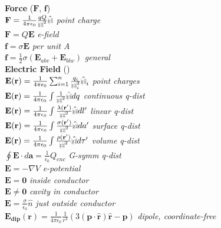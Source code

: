 \documentclass{article}
\def\rcurs{{\mbox{$\resizebox{.09in}{.08in}{\texttt{[image: ScriptR]}}$}}}
\def\brcurs{{\mbox{$\resizebox{.09in}{.08in}{\texttt{[image: BoldR]}}$}}}
\begin{document}
\begin{multicols}{3}
\textbf{Force} ($\mathbf{F}$, $\mathbf{f}$) \\
$\mathbf{F} = \frac{1}{4\pi\epsilon_{0}}\frac{qQ}{\rcurs^{2}}\hat{\brcurs}$  \textit{point charge} \\
$\mathbf{F} = Q\mathbf{E}$ \textit{e-field} \\
$\mathbf{f} = \sigma\mathbf{E}$ \textit {per unit A} \\
$\mathbf{f} = \frac{1}{2}\sigma(\mathbf{E}_{abv} + \mathbf{E}_{blw})$ \textit{general} \\
\textbf{Electric Field} () \\
$\mathbf{E}(\mathbf{r}) = \frac{1}{4\pi\epsilon_{0}}\sum_{i=1}^{n}\frac{q_{i}}{\rcurs_{i}^{2}}\hat{\brcurs}_{i}$ \textit{point charges} \\
$\mathbf{E}(\mathbf{r}) = \frac{1}{4\pi\epsilon_{0}}\int \frac{1}{\rcurs^{2}}\hat{\brcurs} dq$ \textit{continuous q-dist} \\
$\mathbf{E}(\mathbf{r}) = \frac{1}{4\pi\epsilon_{0}}\int \frac{\lambda(\mathbf{r}')}{\rcurs^{2}}\hat{\brcurs} dl'$ \textit{linear q-dist} \\
$\mathbf{E}(\mathbf{r}) = \frac{1}{4\pi\epsilon_{0}}\int \frac{\sigma(\mathbf{r}')}{\rcurs^{2}}\hat{\brcurs} da'$ \textit{surface q-dist} \\
$\mathbf{E}(\mathbf{r}) = \frac{1}{4\pi\epsilon_{0}}\int \frac{\rho(\mathbf{r}')}{\rcurs^{2}}\hat{\brcurs} d\tau'$ \textit{volume q-dist} \\
$\oint\mathbf{E}\cdot d\mathbf{a} = \frac{1}{\epsilon_{0}}Q_{enc}$ \textit{G-symm q-dist} \\
$\mathbf{E} = -\nabla V$ \textit{e-potential} \\
$\mathbf{E} = \mathbf{0}$ \textit{inside conductor} \\
$\mathbf{E} \neq \mathbf{0}$ \textit{cavity in conductor} \\
$\mathbf{E} = \frac{\sigma}{\epsilon_{0}}\hat{n}$ \textit{just outside conductor} \\
$\mathbf{E_{dip}}(\mathbf{r}) = \frac{1}{4\pi\epsilon_{0}}\frac{1}{r^{3}}(3(\mathbf{p}\cdot\mathbf{\hat{r}})\mathbf{\hat{r}} - \mathbf{p})$ \textit{dipole, coordinate-free} \\


\end{multicols}
\end{document}
